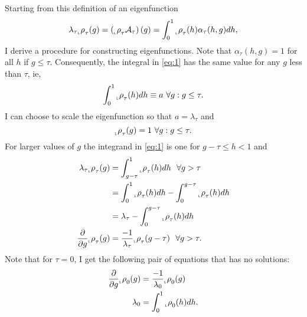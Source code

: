 \documentclass[12pt]{article} \usepackage{amsmath,amsfonts}
\newcommand{\Aop}{{\cal A}}
\newcommand{\Aindicate}{\alpha}
\newcommand{\leftfunction}{{_{_{\scalebox{.4}{L}}} \rho}}
\begin{document}
Starting from this definition of an eigenfunction
\begin{equation}
  \label{eq:1}
  \lambda_\tau \leftfunction_\tau(g) = \left( \leftfunction_\tau
    \Aop_\tau \right) (g) = \int_0^1 \leftfunction_\tau(h)
  \Aindicate_\tau(h,g) dh,  
\end{equation}
I derive a procedure for constructing eigenfunctions.  Note that
$\Aindicate_\tau(h,g) = 1$ for all $h$ if $g \leq \tau$.
Consequently, the integral in \eqref{eq:1} has the same value for any
$g$ less than $\tau$, ie,
\begin{equation*}
  \int_0^1 \leftfunction_\tau(h) dh \equiv a ~\forall g: g \leq \tau.
\end{equation*}
I can choose to scale the eigenfunction so that $a=\lambda_\tau$ and
\begin{equation*}
  \leftfunction_\tau  (g) = 1 ~\forall g: g \leq \tau.
\end{equation*}
For larger values of $g$ the integrand in \eqref{eq:1} is one for
$g-\tau \leq h < 1$ and
\begin{align}
  \lambda_\tau \leftfunction_\tau(g) &= \int_{g-\tau}^1
      \leftfunction_\tau(h) dh ~~\forall g > \tau \nonumber \\
  &= \int_0^1 \leftfunction_\tau(h) dh - \int_0^{g-\tau}
    \leftfunction_\tau(h) dh \nonumber \\
  &= \lambda_\tau - \int_0^{g-\tau} \leftfunction_\tau(h) dh \nonumber
  \\
  \label{eq:delay_ode}
  \frac{\partial}{\partial g} \leftfunction_\tau(g) &=
            \frac{-1}{\lambda_\tau} \leftfunction_\tau(g-\tau)
             ~~\forall g > \tau .  
\end{align}
Note that for $\tau = 0$, I get the following pair of equations that
has no solutions:
\begin{align*}
  \frac{\partial}{\partial g} \leftfunction_0(g) &=
       \frac{-1}{\lambda_0} \leftfunction_0(g) \\
  \lambda_0 &= \int_0^1 \leftfunction_0(h) dh.
\end{align*}
\end{document}
